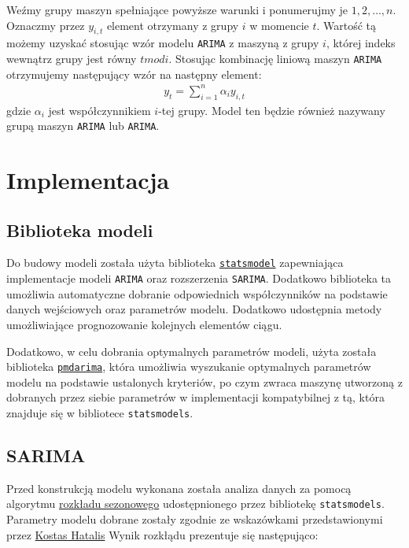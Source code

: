 \documentclass[12pt]{article}
\begin{document}
Weźmy grupy maszyn spełniające powyższe warunki i ponumerujmy je $1, 2, \dots, n$. Oznaczmy przez $y_{i,t}$ element otrzymany z grupy $i$ w momencie $t$. Wartość tą możemy uzyskać stosując wzór modelu \texttt{ARIMA} z maszyną z grupy $i$, której indeks wewnątrz grupy jest równy $t mod i$.
Stosując kombinację liniową maszyn \texttt{ARIMA} otrzymujemy następujący wzór na następny element:
\begin{gather*}
    y_t = \sum^n_{i=1}\alpha_iy_{i,t}
\end{gather*}
gdzie $\alpha_i$ jest współczynnikiem $i$-tej grupy. Model ten będzie również nazywany grupą maszyn \texttt{ARIMA} lub \texttt{ARIMA}.

\section{Implementacja}

\subsection{Biblioteka modeli}

Do budowy modeli została użyta biblioteka \href{https://www.statsmodels.org/stable/index.html}{\texttt{statsmodel}} zapewniająca implementacje modeli \texttt{ARIMA} oraz rozszerzenia \texttt{SARIMA}. Dodatkowo biblioteka ta umożliwia automatyczne dobranie odpowiednich współczynników na podstawie danych wejściowych oraz parametrów modelu. Dodatkowo udostępnia metody umożliwiające prognozowanie kolejnych elementów ciągu.

Dodatkowo, w celu dobrania optymalnych parametrów modeli, użyta została biblioteka \href{https://alkaline-ml.com/pmdarima/}{\texttt{pmdarima}}, która umożliwia wyszukanie optymalnych parametrów modelu na podstawie ustalonych kryteriów, po czym zwraca maszynę utworzoną z dobranych przez siebie parametrów w implementacji kompatybilnej z tą, która znajduje się w bibliotece \texttt{statsmodels}.

\subsection{SARIMA}

Przed konstrukcją modelu wykonana została analiza danych za pomocą algorytmu \href{https://www.statsmodels.org/stable/generated/statsmodels.tsa.seasonal.seasonal_decompose.html}{rozkładu sezonowego} udostępnionego przez bibliotekę \texttt{statsmodels}. Parametry modelu dobrane zostały zgodnie ze wskazówkami przedstawionymi przez \href{https://www.datasciencecentral.com/profiles/blogs/tutorial-forecasting-with-seasonal-arima}{Kostas Hatalis} Wynik rozkłądu prezentuje się następująco:
\end{document}
